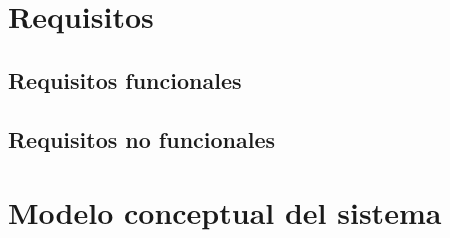\section{Requisitos}
\subsection{Requisitos funcionales}
\subsection{Requisitos no funcionales}
\section{Modelo conceptual del sistema}
